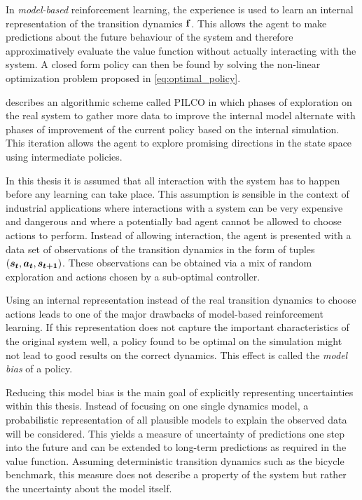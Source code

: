 In \emph{model-based} reinforcement learning, the experience is used to learn an internal representation of the transition dynamics $\operatorname{\mathbf{f}}$.
This allows the agent to make predictions about the future behaviour of the system and therefore approximatively evaluate the value function without actually interacting with the system.
A closed form policy can then be found by solving the non-linear optimization problem proposed in \cref{eq:optimal_policy}.

\citeauthor{deisenroth_efficient_2010} \cite{deisenroth_efficient_2010} describes an algorithmic scheme called PILCO in which phases of exploration on the real system to gather more data to improve the internal model alternate with phases of improvement of the current policy based on the internal simulation.
This iteration allows the agent to explore promising directions in the state space using intermediate policies.

In this thesis it is assumed that all interaction with the system has to happen before any learning can take place.
This assumption is sensible in the context of industrial applications where interactions with a system can be very expensive and dangerous and where a potentially bad agent cannot be allowed to choose actions to perform.
Instead of allowing interaction, the agent is presented with a data set of observations of the transition dynamics in the form of tuples $(\bm{s_t}, \bm{a_t}, \bm{s_{t+1}})$.
These observations can be obtained via a mix of random exploration and actions chosen by a sub-optimal controller.

Using an internal representation instead of the real transition dynamics to choose actions leads to one of the major drawbacks of model-based reinforcement learning.
If this representation does not capture the important characteristics of the original system well, a policy found to be optimal on the simulation might not lead to good results on the correct dynamics.
This effect is called the \emph{model bias} of a policy.

Reducing this model bias is the main goal of explicitly representing uncertainties within this thesis.
Instead of focusing on one single dynamics model, a probabilistic representation of all plausible models to explain the observed data will be considered.
This yields a measure of uncertainty of predictions one step into the future and can be extended to long-term predictions as required in the value function.
Assuming deterministic transition dynamics such as the bicycle benchmark, this measure does not describe a property of the system but rather the uncertainty about the model itself.

